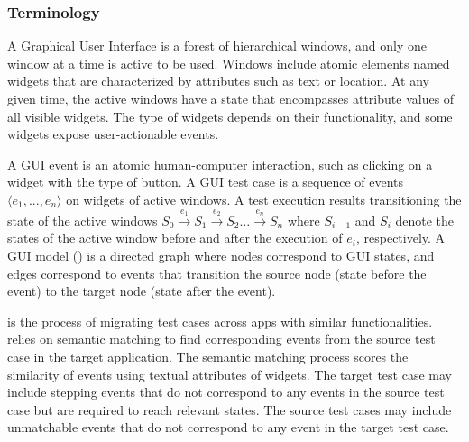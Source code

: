\subsubsection{Terminology}
A Graphical User Interface is a forest of hierarchical windows, and only one window at a time is active to be used. Windows include atomic elements named widgets that are characterized by attributes such as text or location. At any given time, the active windows have a state that encompasses attribute values of all visible widgets. The type of widgets depends on their functionality, and some widgets expose user-actionable events. 

\smallskip
A GUI event is an atomic human-computer interaction, such as clicking on a widget with the type of button.
A GUI test case is a sequence of events $\langle e_1,..., e_n\rangle$ on widgets of active windows.
A test execution results transitioning the state of the active windows $S_{0} \xrightarrow{e_1} S_1 \xrightarrow{e_2} S_2 \ldots \xrightarrow{e_n} S_{n}$ 
where $S_{i-1}$ and $S_i$ denote the states of the active window before and after the execution of $e_i$, respectively. 
A GUI model (\tam) is a directed graph where nodes correspond to GUI states, and edges correspond to events that transition the source node (state before the event) to the target node (state after the event). 


\smallskip
\testreuse is the process of migrating test cases across apps with similar functionalities. \testreuse relies on semantic matching to find corresponding events from the source test case in the target application. The semantic matching process scores the similarity of events using textual attributes of widgets.
The target test case may include stepping events that do not correspond to any events in the source test case but are required to reach relevant states. 
The source test cases may include unmatchable events that do not correspond to any event in the target test case. 


